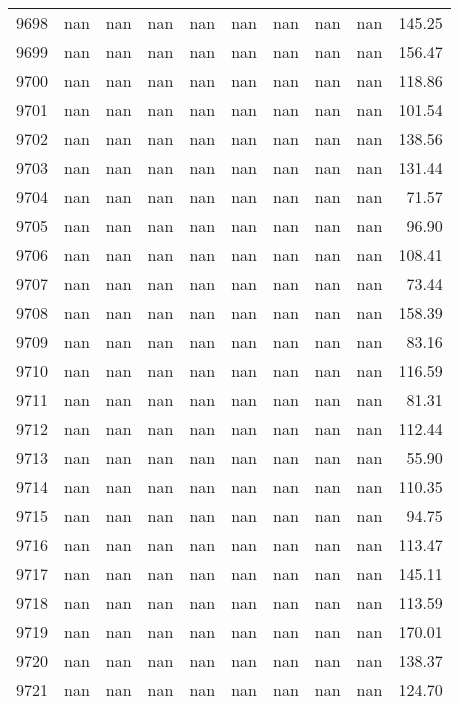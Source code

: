 \begin{tabular}{lrrrrrrrrr}
9698 & nan & nan & nan & nan & nan & nan & nan & nan & 145.25 \\
9699 & nan & nan & nan & nan & nan & nan & nan & nan & 156.47 \\
9700 & nan & nan & nan & nan & nan & nan & nan & nan & 118.86 \\
9701 & nan & nan & nan & nan & nan & nan & nan & nan & 101.54 \\
9702 & nan & nan & nan & nan & nan & nan & nan & nan & 138.56 \\
9703 & nan & nan & nan & nan & nan & nan & nan & nan & 131.44 \\
9704 & nan & nan & nan & nan & nan & nan & nan & nan & 71.57 \\
9705 & nan & nan & nan & nan & nan & nan & nan & nan & 96.90 \\
9706 & nan & nan & nan & nan & nan & nan & nan & nan & 108.41 \\
9707 & nan & nan & nan & nan & nan & nan & nan & nan & 73.44 \\
9708 & nan & nan & nan & nan & nan & nan & nan & nan & 158.39 \\
9709 & nan & nan & nan & nan & nan & nan & nan & nan & 83.16 \\
9710 & nan & nan & nan & nan & nan & nan & nan & nan & 116.59 \\
9711 & nan & nan & nan & nan & nan & nan & nan & nan & 81.31 \\
9712 & nan & nan & nan & nan & nan & nan & nan & nan & 112.44 \\
9713 & nan & nan & nan & nan & nan & nan & nan & nan & 55.90 \\
9714 & nan & nan & nan & nan & nan & nan & nan & nan & 110.35 \\
9715 & nan & nan & nan & nan & nan & nan & nan & nan & 94.75 \\
9716 & nan & nan & nan & nan & nan & nan & nan & nan & 113.47 \\
9717 & nan & nan & nan & nan & nan & nan & nan & nan & 145.11 \\
9718 & nan & nan & nan & nan & nan & nan & nan & nan & 113.59 \\
9719 & nan & nan & nan & nan & nan & nan & nan & nan & 170.01 \\
9720 & nan & nan & nan & nan & nan & nan & nan & nan & 138.37 \\
9721 & nan & nan & nan & nan & nan & nan & nan & nan & 124.70 \\
9722 & nan & nan & nan & nan & nan & nan & nan & nan & 87.65 \\

\end{tabular}
